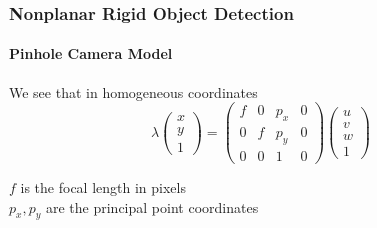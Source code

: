 \documentclass[xetex,professionalfont]{beamer}
\begin{document}

\begin{frame}
\frametitle{Nonplanar Rigid Object Detection}
\framesubtitle{Pinhole Camera Model}


We see that in homogeneous coordinates %
\[
\lambda
\begin{pmatrix}
    x \\ y \\ 1
\end{pmatrix} =
\begin{pmatrix}
    f & 0 & p_x & 0 \\ 0 & f & p_y & 0 \\ 0 & 0 & 1 & 0
\end{pmatrix}
\begin{pmatrix}
    u \\ v \\ w \\ 1
\end{pmatrix}
\]

$f$ is the focal length in pixels \\
$p_x,p_y$ are the principal point coordinates

\end{frame}

\end{document}

